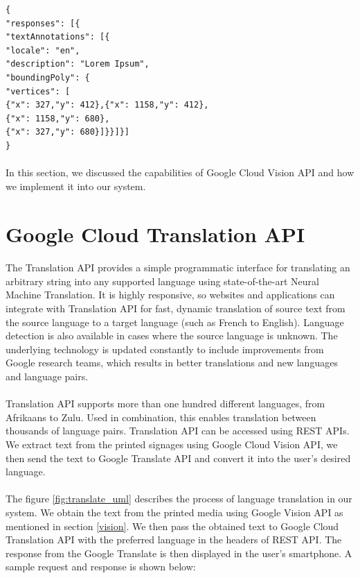 \documentclass[12pt]{article}
\begin{document}
\begin{lstlisting}
{
"responses": [{
"textAnnotations": [{
"locale": "en",
"description": "Lorem Ipsum",
"boundingPoly": {
"vertices": [
{"x": 327,"y": 412},{"x": 1158,"y": 412},
{"x": 1158,"y": 680},
{"x": 327,"y": 680}]}}]}]
}
\end{lstlisting}

\paragraph{} In this section, we discussed the capabilities of Google Cloud Vision API and how we implement it into our system. 

\section{Google Cloud Translation API}
\label{translate}

\paragraph{}The Translation API provides a simple programmatic interface for translating an arbitrary string into any supported language using state-of-the-art Neural Machine Translation. It is highly responsive, so websites and applications can integrate with Translation API for fast, dynamic translation of source text from the source language to a target language (such as French to English). Language detection is also available in cases where the source language is unknown. The underlying technology is updated constantly to include improvements from Google research teams, which results in better translations and new languages and language pairs.

\paragraph{}Translation API supports more than one hundred different languages, from Afrikaans to Zulu. Used in combination, this enables translation between thousands of language pairs. Translation API can be accessed using REST APIs. We extract text from the printed signages using Google Cloud Vision API, we then send the text to Google Translate API and convert it into the user's desired language.

\paragraph{}The figure \ref{fig:translate_uml} describes the process of language translation in our system. We obtain the text from the printed media using Google Vision API as mentioned in section \ref{vision}. We then pass the obtained text to Google Cloud Translation API with the preferred language in the headers of REST API. The response from the Google Translate is then displayed in the user's smartphone. A sample request and response is shown below:
\end{document}
